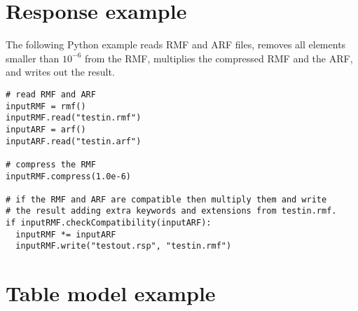 \documentclass[11pt]{book}
\begin{document}
\section{Response example}

The following Python example reads RMF and ARF files, removes all
elements smaller than $10^{-6}$ from the RMF, multiplies the
compressed RMF and the ARF, and writes out the result.
\begin{verbatim}
# read RMF and ARF
inputRMF = rmf()
inputRMF.read("testin.rmf")
inputARF = arf()
inputARF.read("testin.arf")

# compress the RMF
inputRMF.compress(1.0e-6)

# if the RMF and ARF are compatible then multiply them and write
# the result adding extra keywords and extensions from testin.rmf.
if inputRMF.checkCompatibility(inputARF):
  inputRMF *= inputARF
  inputRMF.write("testout.rsp", "testin.rmf")

\end{verbatim}

\section{Table model example}
\end{document}
